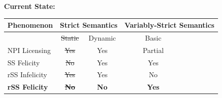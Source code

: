 \begin{frame}[t]
\sectionpage\vskip 9pt\textbf{\huge Current State:}\vskip 18pt
\begin{table}[]
    \centering
    \begin{tabular}{l||cc|ccc}
    Phenomenon  &    \multicolumn{2}{|c|}{Strict Semantics}    &  \multicolumn{3}{|c}{Variably-Strict Semantics}\\\hline\hline
                            &   \sout{Static}  & Dynamic    &   Basic    &     &    \\\hline
    \color{Gray}NPI Licensing           &   \sout{\color{Gray}Yes}     &  \color{Gray}Yes      &   \color{Gray}Partial   &      &   \\
    SS Felicity     &   \sout{No}      &  Yes      &   Yes     &        &   \\
    rSS Infelicity    &   \sout{Yes}      &   Yes      &   {No}     &        & \\
    \textbf{rSS Felicity}    &   \sout{\textbf{No}}  &   \textbf{No}  &   \textbf{Yes} & 
    \end{tabular}
\end{table}
\end{frame}

